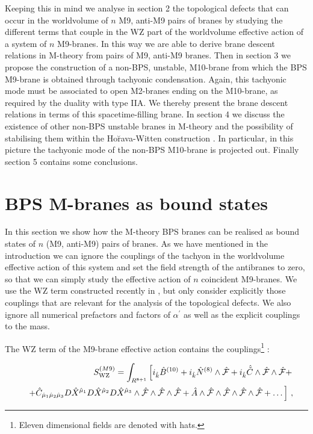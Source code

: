 \documentclass[12pt,a4paper]{article}
\begin{document}
Keeping this in mind we analyse in section 2 the topological defects 
that can occur in the
worldvolume of $n$ M9, anti-M9 pairs of branes by studying the different
terms that couple in the WZ part of the worldvolume effective action
of a system of $n$ M9-branes. In this way we are able to derive
brane descent relations in M-theory from pairs of M9, anti-M9
branes. Then in section 3 we propose the construction of  a 
non-BPS, unstable, M10-brane from which the BPS M9-brane is obtained
through tachyonic condensation. Again, this tachyonic mode must be
associated to open M2-branes ending on the M10-brane, as required
by the duality with type IIA.
We thereby present the brane descent relations in terms of this 
spacetime-filling brane. In section 4 we discuss the existence of
other non-BPS unstable branes in M-theory and the possibility of
stabilising them within the Ho\u{r}ava-Witten construction \cite{HW}.
In particular, in this picture the tachyonic mode of the non-BPS 
M10-brane is projected out. Finally section 5 contains some conclusions.





 
\section{BPS M-branes as bound states}

In this section we show how the M-theory BPS branes can be realised as
bound states of $n$ (M9, anti-M9) pairs of branes. As we have mentioned
in the introduction we can ignore the couplings of the tachyon in
the worldvolume effective action of this system and set the field 
strength of the antibranes to zero, so that we can 
simply study the effective action of $n$ coincident M9-branes. 
We use the WZ term 
constructed recently in \cite{Sato}, but
only consider explicitly those couplings
that are relevant for the analysis of the topological defects. 
We also ignore all numerical prefactors and factors of $\alpha^\prime$
as well as the explicit couplings to the mass.

The WZ term of the M9-brane effective action contains the 
couplings\footnote{Eleven
dimensional fields are denoted with hats.} \cite{Sato}:

\begin{eqnarray}
\label{M9WZ}
&&S^{(M9)}_{\rm WZ}=\int_{R^{8+1}}\left[ i_{\hat k}{\hat B}^{(10)}+
i_{\hat k}{\hat N}^{(8)}\wedge {\hat {\cal F}}+i_{\hat k}{\hat {\tilde C}}
\wedge {\hat {\cal F}}\wedge {\hat {\cal F}}+ \right. \\ 
&&\left. +{\hat C}_{{\hat \mu}_1{\hat \mu}_2
{\hat \mu}_3}D{\hat X}^{{\hat \mu}_1}D{\hat X}^{{\hat \mu}_2}
D{\hat X}^{{\hat \mu}_3}\wedge
{\hat {\cal F}}\wedge {\hat {\cal F}}\wedge {\hat {\cal F}}+
{\hat A}\wedge {\hat {\cal F}}\wedge {\hat {\cal F}}
\wedge {\hat {\cal F}}\wedge {\hat {\cal F}}+\dots
\right]\, ,\nonumber
\end{eqnarray}
\end{document}

